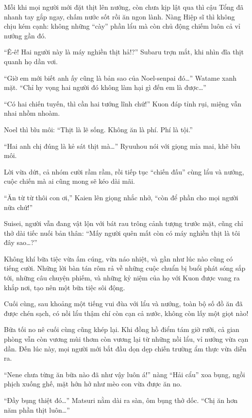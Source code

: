 \documentclass[../main.tex]{subfiles}
\begin{document}
Mỗi khi mọi người mới đặt thịt lên nướng, còn chưa kịp lật qua thì cậu Tổng đã nhanh tay gắp ngay, chấm nước sốt rồi ăn ngon lành. Nàng Hiệp sĩ thì không chịu kém cạnh: không những ``cày'' phần lẩu mà còn chủ động chiếm luôn cả vỉ nướng gần đó.

``Ê-ê! Hai người này là máy nghiền thịt hả!?'' Subaru trợn mắt, khi nhìn đĩa thịt quanh họ dần vơi.

``Giờ em mới biết anh ấy cũng là bản sao của Noel-senpai đó\dots'' Watame xanh mặt. ``Chỉ hy vọng hai người đó không làm hại gì đến em là được\dots''

``Có hai chiến tuyến, thì cần hai tướng lĩnh chứ!'' Kuon đáp tỉnh rụi, miệng vẫn nhai nhồm nhoàm.

Noel thì bĩu môi: ``Thịt là lẽ sống. Không ăn là phí. Phí là tội.''

``Hai anh chị đúng là kẻ sát thịt mà\dots'' Ryuuhou nói với giọng mỉa mai, khẽ bĩu môi.

Lời vừa dứt, cả nhóm cười rầm rầm, rồi tiếp tục ``chiến đấu'' cùng lẩu và nướng, cuộc chiến mà ai cũng mong sẽ kéo dài mãi.

``Ăn từ từ thôi con ơi,'' Kaien lên giọng nhắc nhở, ``còn để phần cho mọi người nữa chứ!''

Suisei, người vẫn đang vật lộn với bát rau trông cảnh tượng trước mặt, cũng chỉ thở dài tiếc nuối bản thân: ``Mấy người quên mất còn có máy nghiền thịt là tôi đây sao\dots?''

Không khí bữa tiệc vừa ấm cúng, vừa náo nhiệt, và gần như lúc nào cũng có tiếng cười. Những lời bàn tán rôm rả về những cuộc chuẩn bị buổi phát sóng sắp tới, những câu chuyện phiếm, và những kỷ niệm của họ với Kuon được vang ra khắp nơi, tạo nên một bữa tiệc sôi động.

Cuối cùng, sau khoảng một tiếng vui đùa với lẩu và nướng, toàn bộ số đồ ăn đã được chén sạch, có nồi lẩu thậm chí còn cạn cả nước, không còn lấy một giọt nào!

Bữa tối no nê cuối cùng cũng khép lại. Khi đồng hồ điểm tám giờ rưỡi, cả gian phòng vẫn còn vương mùi thơm còn vương lại từ những nồi lẩu, vỉ nướng vừa cạn dần. Đến lúc này, mọi người mới bắt đầu dọn dẹp chiến trường ẩm thực vừa diễn ra.

``Nene chưa từng ăn bữa nào đã như vậy luôn á!'' nàng ``Hải cẩu'' xoa bụng, ngồi phịch xuống ghế, mặt hớn hở như mèo con vừa được ăn no.

``Đầy bụng thiệt đó\dots'' Matsuri nằm dài ra sàn, ôm bụng thở dốc. ``Chị ăn hơn năm phần thịt luôn\dots''
\end{document}
